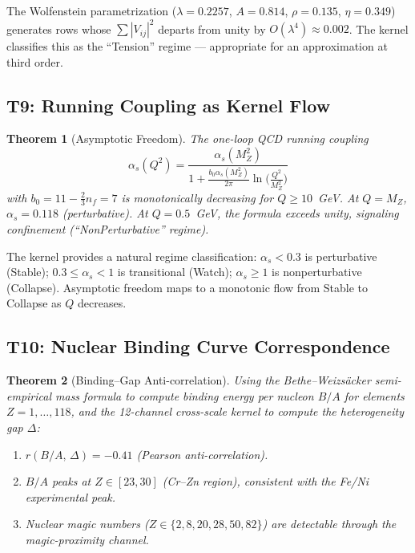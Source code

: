 \documentclass[
  aps,
  prd,
  twocolumn,
  superscriptaddress,
  nofootinbib,
  floatfix
]{revtex4-2}
\newtheorem{theorem}{Theorem}
\newcommand{\beq}{\begin{equation}}
\newcommand{\eeq}{\end{equation}}
\begin{document}
The Wolfenstein parametrization
($\lambda = 0.2257$, $A = 0.814$, $\rho = 0.135$, $\eta = 0.349$)
generates rows whose $\sum |V_{ij}|^2$ departs from unity by
$O(\lambda^4) \approx 0.002$.  The kernel classifies this as
the ``Tension'' regime --- appropriate for an approximation
at third order.

\subsection{T9: Running Coupling as Kernel Flow}

\begin{theorem}[Asymptotic Freedom]\label{thm:T9}
The one-loop QCD running coupling
\beq
  \alpha_s(Q^2) = \frac{\alpha_s(M_Z^2)}
    {1 + \frac{b_0 \alpha_s(M_Z^2)}{2\pi}
      \ln\!\bigl(\tfrac{Q^2}{M_Z^2}\bigr)}
\eeq
with $b_0 = 11 - \tfrac{2}{3}n_f = 7$ is monotonically
decreasing for $Q \geq 10$~GeV.  At $Q = M_Z$,
$\alpha_s = 0.118$ (perturbative).  At $Q = 0.5$~GeV, the
formula exceeds unity, signaling confinement (``NonPerturbative''
regime).
\end{theorem}

The kernel provides a natural regime classification:
$\alpha_s < 0.3$ is perturbative (Stable); $0.3 \leq \alpha_s < 1$
is transitional (Watch); $\alpha_s \geq 1$ is nonperturbative
(Collapse).  Asymptotic freedom maps to a monotonic flow from
Stable to Collapse as $Q$ decreases.

\subsection{T10: Nuclear Binding Curve Correspondence}

\begin{theorem}[Binding--Gap Anti-correlation]\label{thm:T10}
Using the Bethe--Weizs\"acker semi-empirical mass formula to
compute binding energy per nucleon $B/A$ for elements
$Z = 1, \ldots, 118$, and the 12-channel cross-scale kernel to
compute the heterogeneity gap $\Delta$:
\begin{enumerate}
\item $r(B/A,\,\Delta) = -0.41$ (Pearson anti-correlation).
\item $B/A$ peaks at $Z \in [23, 30]$ (Cr--Zn region),
      consistent with the Fe/Ni experimental peak.
\item Nuclear magic numbers ($Z \in \{2, 8, 20, 28, 50, 82\}$)
      are detectable through the magic-proximity channel.
\end{enumerate}
\end{theorem}
\end{document}
